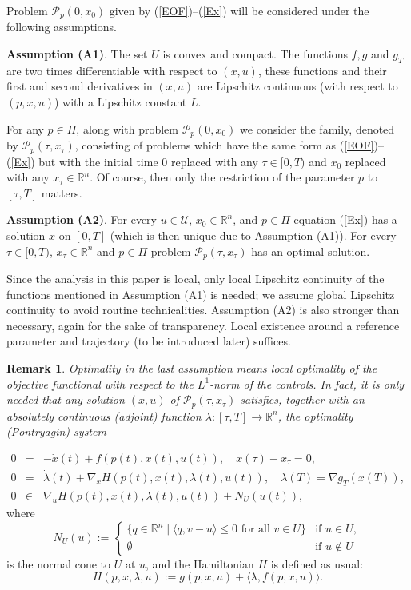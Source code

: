 \documentclass[11pt]{article}
\newtheorem{rem}[theo]{Remark}
\newcommand{\bd}{\begin{displaymath}}
\newcommand{\ed}{\end{displaymath}}
\newcommand{\bea}{\begin{eqnarray}}
\newcommand{\eea}{\end{eqnarray}}
\newcommand{\R}{\mathbb R}
\newcommand{\U}{\mathcal U}
\renewcommand{\lll}{\langle}
\newcommand{\rrr}{\rangle}
\newcommand{\p}{{\mathcal P}}
\def\R{\mathbb{R}}
\newcommand{\bino}{\bigskip\noindent}
\begin{document}
Problem $\p_p(0,x_0)$ given by (\ref{EOF})--(\ref{Ex}) will be considered under the following assumptions.

\bino
{\bf Assumption (A1)}. The set $U$ is convex and compact. The functions $f,g$ and $g_T$ are two times differentiable 
with respect to $(x,u)$, these functions and their first and second derivatives in $(x,u)$ are Lipschitz continuous 
(with respect to $(p,x,u)$) with a Lipschitz constant $L$. 

\bino
For any $p \in \Pi$, along with problem $\p_p(0,x_0)$ we consider the family, denoted by $\p_p(\tau,x_\tau)$, 
consisting of problems which have the same form as (\ref{EOF})--(\ref{Ex}) but  with the initial time $0$ 
replaced with any $\tau \in [0,T)$ and $x_0$ replaced with any $x_\tau \in \R^n$. 
Of course, then only the restriction of the parameter $p$ to $[\tau,T]$ matters. 

\bino
{\bf Assumption (A2)}. 
For every $u \in \U$, $x_0 \in \R^n$, and $p \in \varPi$ equation (\ref{Ex}) has a solution $x$ on $[0,T]$ 
(which is then unique due to Assumption (A1)).
For every $\tau \in [0,T)$, $x_\tau \in \R^n$ and $p \in \varPi$  problem $\p_p(\tau,x_\tau)$ has an optimal solution. 

\bino
Since the analysis in this paper is local, only local Lipschitz continuity of the functions mentioned in Assumption (A1) 
is needed; we assume global Lipschitz continuity to avoid routine technicalities.
Assumption (A2) is also stronger than necessary, again for the sake of transparency. Local existence around a reference
parameter and trajectory (to be introduced later) suffices.

\begin{rem} \label{Rsol}{\em
Optimality in the last assumption means local optimality of the objective functional with respect to the $L^1$-norm
of the controls.  
In fact, it is only needed that any solution $(x,u)$ of $\p_p(\tau,x_\tau)$ satisfies, together with
an absolutely continuous ({\em adjoint}) function $\lambda : [\tau, T] \to \R^n$, the {\em optimality (Pontryagin) system}
}\end{rem}
\vspace{-0.5cm}
 \bea
        0 &=&   - \dot x(t) + f(p(t),x(t), u(t)), \quad x(\tau) - x_\tau = 0,   \label{EPx}\\
      0 &=&  \dot \lambda (t) + \nabla_{\!\! x} H(p(t),x(t),\lambda(t),u(t)), \quad \lambda(T) = \nabla g_T(x(T)),  \label{EPlambda} \\
        0 &\in& \nabla_{\!\! u} H(p(t),x(t),\lambda(t),u(t)) + N_U(u(t)),   \label{EPu}  
\eea
where 
\bd
     N_U(u) := \left\{ \begin{array}{ll} \{q \in \R^n  \mid {\langle q, v-u \rangle} \leq 0
      {\text{ for all } v \in U}\} & {\text{if } u \in U,}\\
             \emptyset & \text{if } u \notin U  \end{array}\right.
\ed
is the normal cone to $U$ at $u$, and the Hamiltonian $H$ is defined as usual:
\bd
                 H(p,x,\lambda,u) := g(p,x,u) + \lll \lambda, f(p,x,u) \rrr.
\ed
\end{document}
